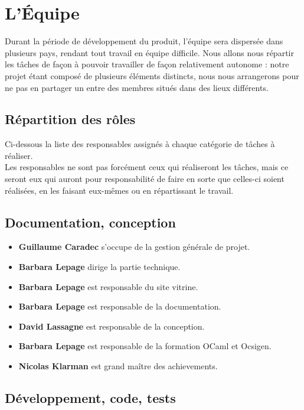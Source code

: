 \documentclass{life-fr}
\begin{document}
\newpage

\section{L'Équipe}

Durant la période de développement du produit, l'équipe sera dispersée dans plusieurs pays, rendant tout travail en équipe difficile. Nous allons nous répartir les tâches de façon à pouvoir travailler de façon relativement autonome : notre projet étant composé de plusieurs éléments distincts, nous nous arrangerons pour ne pas en partager un entre des membres situés dans des lieux différents.\\

\subsection{ Répartition des rôles}

Ci-dessous la liste des responsables assignés à chaque catégorie de tâches à
réaliser.\\
Les responsables ne sont pas forcément ceux qui réaliseront les tâches, mais ce
seront eux qui auront pour responsabilité de faire en sorte que celles-ci soient
réalisées, en les faisant eux-mêmes ou en répartissant le travail.

\subsection{ Documentation, conception}

\begin{itemize}
  \item \textbf{Guillaume Caradec} s'occupe de la gestion générale de projet.
  \item \textbf{Barbara Lepage} dirige la partie technique.
  \item \textbf{Barbara Lepage} est responsable du site vitrine.
  \item \textbf{Barbara Lepage} est responsable de la documentation.
  \item \textbf{David Lassagne} est responsable de la conception.
  \item \textbf{Barbara Lepage} est responsable de la formation OCaml et Ocsigen.
  \item \textbf{Nicolas Klarman} est grand maître des achievements.
\end{itemize}

\subsection{ Développement, code, tests}
\end{document}

